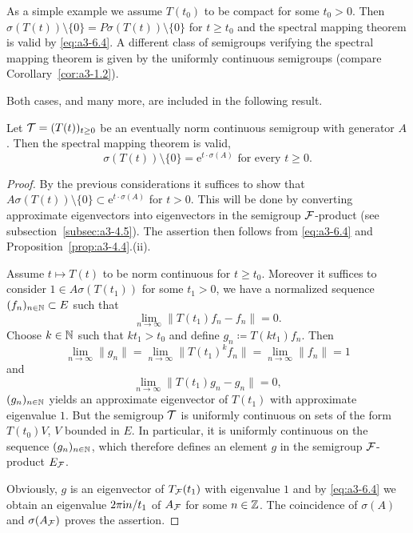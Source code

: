 As a simple example we assume $T(t_{0})$ to be compact for some $t_{0} > 0$.
Then $\sigma(T(t)) \setminus \{0\} = P\sigma(T(t)) \setminus \{0\}$ for $t \geq t_{0}$ and the spectral mapping theorem is valid by \eqref{eq:a3-6.4}.
A different class of semigroups verifying the spectral mapping theorem is given by the uniformly continuous semigroups (compare Corollary~\ref{cor:a3-1.2}).

Both cases, and many more, are included in the following result.
\begin{theorem}\label{thm:a3-6.6}
Let $\mathcal{T} = (T(t))_{t\geq 0}$ be an eventually norm continuous semigroup with generator $A$.
Then the spectral mapping theorem is valid, \ie 
\begin{equation}\label{eq:a3-6.6)}
	\sigma(T(t)) \setminus \{0\} = \mathrm{e}^{t \cdot \sigma(A)} \text{ for every } t \geq 0 .
\end{equation}
\end{theorem}
\begin{proof}
By the previous considerations it suffices to show that $A\sigma(T(t)) \setminus \{0\} \subset \mathrm{e}^{t \cdot \sigma(A)}$ for $t > 0$.
This will be done by converting approximate eigenvectors into eigenvectors in the semigroup $\mathcal{F}$-product (see subsection~\ref{subsec:a3-4.5}).
The assertion then follows from \eqref{eq:a3-6.4} and Proposition~\ref{prop:a3-4.4}.(ii).

Assume $t \mapsto T(t)$ to be norm continuous for $t \geq t_{0}$.
Moreover it suffices to consider $1 \in A\sigma(T(t_{1}))$ for some $t_{1} > 0$, \ie we have a normalized sequence $(f_{n})_{n\in\mathbb{N}} \subset E$ such that
\[
\lim_{n\to\infty} \|T(t_{1})f_{n} - f_{n}\| = 0 .
\]
Choose $k \in \mathbb{N}$ such that $kt_{1} > t_{0}$ and define $g_{n} \coloneqq T(kt_{1})f_{n}$.
Then
\[
\lim_{n\to\infty}\|g_{n}\| = \lim_{n\to\infty}\|T(t_{1})^{k}f_{n}\| = \lim_{n\to\infty}\|f_{n}\| = 1
\]
and
\[
\lim_{n\to\infty} \|T(t_{1})g_{n} - g_{n}\| = 0 ,
\]
\ie $(g_{n})_{n\in\mathbb{N}}$ yields an approximate eigenvector of $T(t_{1})$ with approximate eigenvalue $1$.
But the semigroup $\mathcal{T}$ is uniformly continuous on sets of the form $T(t_{0})V$, $V$ bounded in $E$.
In particular, it is uniformly continuous on the sequence $(g_{n})_{n\in\mathbb{N}}$, which therefore defines an element $g$ in the semigroup $\mathcal{F}$-product $E_{\mathcal{F}}$.

Obviously, $g$ is an eigenvector of $T_{\mathcal{F}}(t_{1})$ with eigenvalue $1$ and by \eqref{eq:a3-6.4} we obtain an eigenvalue $2\pi\mathrm{i}  n/t_{1}$ of $A_{\mathcal{F}}$ for some $n \in \mathbb{Z}$.
The coincidence of $\sigma(A)$ and $\sigma(A_{\mathcal{F}})$ proves the assertion.
\end{proof}
